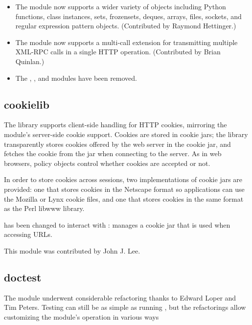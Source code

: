 \documentclass{howto}
\begin{document}
\begin{itemize}
\item The  module now supports a wider variety of objects
   including Python functions, class instances, sets, frozensets, deques,
   arrays, files, sockets, and regular expression pattern objects.
   (Contributed by Raymond Hettinger.)

\item The  module now supports a multi-call extension for 
transmitting multiple XML-RPC calls in a single HTTP operation.
(Contributed by Brian Quinlan.)

\item The , , and  modules have 
been removed.
   
\end{itemize}



\subsection{cookielib}

The  library supports client-side handling for HTTP
cookies, mirroring the  module's server-side cookie
support. Cookies are stored in cookie jars; the library transparently
stores cookies offered by the web server in the cookie jar, and
fetches the cookie from the jar when connecting to the server. As in
web browsers, policy objects control whether cookies are accepted or
not.

In order to store cookies across sessions, two implementations of
cookie jars are provided: one that stores cookies in the Netscape
format so applications can use the Mozilla or Lynx cookie files, and
one that stores cookies in the same format as the Perl libwww library.

 has been changed to interact with :
 manages a cookie jar that is used when
accessing URLs.

This module was contributed by John J. Lee.


\subsection{doctest}

The  module underwent considerable refactoring thanks
to Edward Loper and Tim Peters.  Testing can still be as simple as
running , but the refactorings allow
customizing the module's operation in various ways
\end{document}
